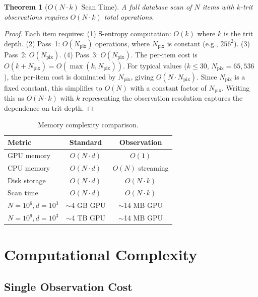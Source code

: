 \documentclass[11pt,twocolumn,a4paper]{article}
\newtheorem{theorem}{Theorem}[section]
\theoremstyle{definition}
\theoremstyle{remark}
\newcommand{\Npix}{N_{\mathrm{pix}}}
\begin{document}
\begin{theorem}[$O(N \cdot k)$ Scan Time]
\label{thm:scan_time}
A full database scan of $N$ items with $k$-trit observations requires $O(N \cdot k)$ total operations.
\end{theorem}

\begin{proof}
Each item requires: (1) S-entropy computation: $O(k)$ where $k$ is the trit depth. (2) Pass~1: $O(\Npix)$ operations, where $\Npix$ is constant (e.g., $256^2$). (3) Pass~2: $O(\Npix)$. (4) Pass~3: $O(\Npix)$. The per-item cost is $O(k + \Npix) = O(\max(k, \Npix))$. For typical values ($k \leq 30$, $\Npix = 65{,}536$), the per-item cost is dominated by $\Npix$, giving $O(N \cdot \Npix)$. Since $\Npix$ is a fixed constant, this simplifies to $O(N)$ with a constant factor of $\Npix$. Writing this as $O(N \cdot k)$ with $k$ representing the observation resolution captures the dependence on trit depth.
\end{proof}

\begin{table}[H]
\centering
\caption{Memory complexity comparison.}
\label{tab:memory_comparison}
\begin{tabular}{@{}lcc@{}}
\toprule
\textbf{Metric} & \textbf{Standard} & \textbf{Observation} \\
\midrule
GPU memory & $O(N \cdot d)$ & $O(1)$ \\
CPU memory & $O(N \cdot d)$ & $O(N)$ streaming \\
Disk storage & $O(N \cdot d)$ & $O(N \cdot k)$ \\
Scan time & $O(N \cdot d)$ & $O(N \cdot k)$ \\
$N = 10^6, d = 10^3$ & $\sim$4 GB GPU & $\sim$14 MB GPU \\
$N = 10^9, d = 10^3$ & $\sim$4 TB GPU & $\sim$14 MB GPU \\
\bottomrule
\end{tabular}
\end{table}


\section{Computational Complexity}
\label{sec:computational_complexity}

\subsection{Single Observation Cost}
\end{document}
